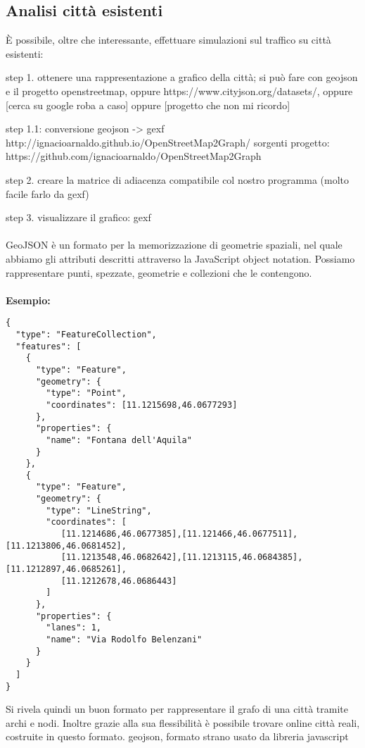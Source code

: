 \documentclass[main.tex]{subfiles}
\begin{document}
\subsection{Analisi città esistenti}
È possibile, oltre che interessante, effettuare simulazioni sul traffico su città esistenti: 

step 1. ottenere una rappresentazione a grafico della città; si può fare con geojson e il progetto openstreetmap, oppure https://www.cityjson.org/datasets/, oppure [cerca su google roba a caso] oppure [progetto che non mi ricordo]

step 1.1: conversione geojson -> gexf http://ignacioarnaldo.github.io/OpenStreetMap2Graph/
sorgenti progetto: https://github.com/ignacioarnaldo/OpenStreetMap2Graph

step 2. creare la matrice di adiacenza compatibile col nostro programma (molto facile farlo da gexf)

step 3. visualizzare il grafico: gexf 
\\
\\
GeoJSON è un formato per la memorizzazione di geometrie spaziali, nel quale abbiamo gli attributi descritti attraverso la JavaScript object notation.
Possiamo rappresentare punti, spezzate, geometrie e collezioni che le contengono.
\\
\\
\textbf{Esempio:}
\begin{lstlisting}
{
  "type": "FeatureCollection",
  "features": [
    {
      "type": "Feature",
      "geometry": {
        "type": "Point",
        "coordinates": [11.1215698,46.0677293]
      },
      "properties": {
        "name": "Fontana dell'Aquila"
      }
    },
    {
      "type": "Feature",
      "geometry": {
        "type": "LineString",
        "coordinates": [
           [11.1214686,46.0677385],[11.121466,46.0677511],[11.1213806,46.0681452],          
           [11.1213548,46.0682642],[11.1213115,46.0684385],[11.1212897,46.0685261],
           [11.1212678,46.0686443]
        ]
      },
      "properties": {
        "lanes": 1,
        "name": "Via Rodolfo Belenzani"
      }
    }
  ]
}
\end{lstlisting}
Si rivela quindi un buon formato per rappresentare il grafo di una città tramite archi e nodi.
Inoltre grazie alla sua flessibilità è possibile trovare online città reali, costruite in questo formato.
geojson, formato strano usato da libreria javascript 
\end{document}
